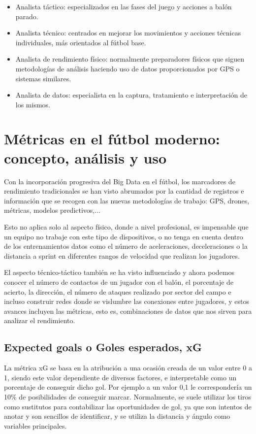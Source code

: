 \begin{itemize}
    \item Analista táctico: especializados en las fases del juego y acciones 
    a balón parado.
    \item Analista técnico: centrados en mejorar los movimientos y acciones 
    técnicas individuales, más orientados al fútbol base.
    \item Analista de rendimiento físico: normalmente preparadores físicos 
    que siguen metodologías de análisis haciendo uso de datos 
    proporcionados por GPS o sistemas similares.
    \item Analista de datos: especialista en la captura, tratamiento e 
    interpretación de los mismos.
\end{itemize}

\section{Métricas en el fútbol moderno: concepto, análisis y uso}
Con la incorporación progresiva del Big Data en el fútbol, 
los marcadores de rendimiento tradicionales se han visto 
abrumados por la cantidad de registros e información que 
se recogen con las nuevas metodologías de trabajo: GPS, drones, 
métricas, modelos predictivos,...

Esto no aplica solo al aspecto físico, donde a nivel profesional, 
es impensable que un equipo no trabaje con este tipo de dispositivos, 
o no tenga en cuenta dentro de los entrenamientos datos como el 
número de aceleraciones, deceleraciones o la distancia a sprint 
en diferentes rangos de velocidad que realizan los jugadores.

El aspecto técnico-táctico también se ha visto influenciado y 
ahora podemos conocer el número de contactos de un jugador con 
el balón, el porcentaje de acierto, la dirección, el número de 
ataques realizado por sector del campo e incluso construir 
redes donde se vislumbre las conexiones entre jugadores, y 
estos avances incluyen las métricas, esto es, combinaciones de datos 
que nos sirven para analizar el rendimiento.

\subsection{Expected goals o Goles esperados, xG}
La métrica xG se basa en la atribución a una ocasión creada de 
un valor entre 0 a 1, siendo este valor dependiente de diversos 
factores, e interpretable como un porcentaje de conseguir dicho gol. 
Por ejemplo a un valor 0,1 le correspondería un 10\% de posibilidades 
de conseguir marcar. Normalmente, se suele utilizar los tiros 
como sustitutos para contabilizar las oportunidades de gol, 
ya que son intentos de anotar y son sencillos de identificar, 
y se utiliza la distancia y ángulo como variables principales.

